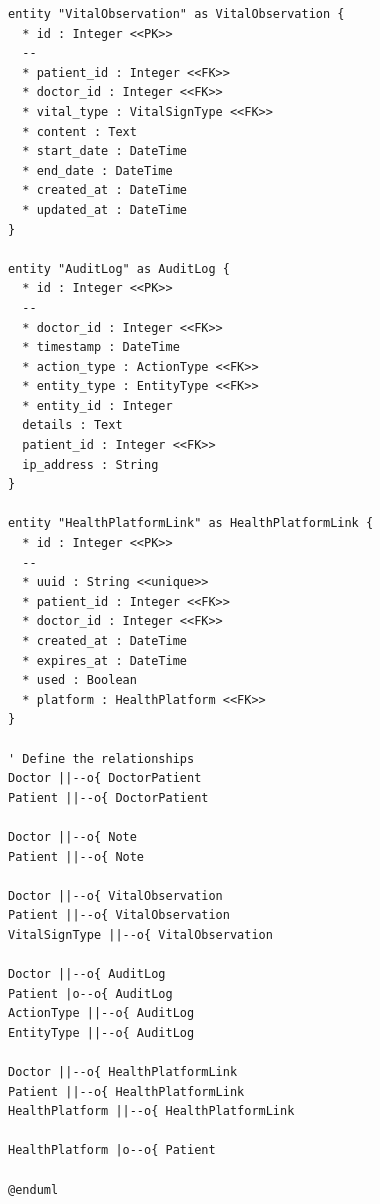 \documentclass[12pt,a4paper,oneside]{report}
\begin{document}
\begin{lstlisting}[basicstyle=\small\ttfamily, breaklines=true]
entity "VitalObservation" as VitalObservation {
  * id : Integer <<PK>>
  --
  * patient_id : Integer <<FK>>
  * doctor_id : Integer <<FK>>
  * vital_type : VitalSignType <<FK>>
  * content : Text
  * start_date : DateTime
  * end_date : DateTime
  * created_at : DateTime
  * updated_at : DateTime
}

entity "AuditLog" as AuditLog {
  * id : Integer <<PK>>
  --
  * doctor_id : Integer <<FK>>
  * timestamp : DateTime
  * action_type : ActionType <<FK>>
  * entity_type : EntityType <<FK>>
  * entity_id : Integer
  details : Text
  patient_id : Integer <<FK>>
  ip_address : String
}

entity "HealthPlatformLink" as HealthPlatformLink {
  * id : Integer <<PK>>
  --
  * uuid : String <<unique>>
  * patient_id : Integer <<FK>>
  * doctor_id : Integer <<FK>>
  * created_at : DateTime
  * expires_at : DateTime
  * used : Boolean
  * platform : HealthPlatform <<FK>>
}

' Define the relationships
Doctor ||--o{ DoctorPatient
Patient ||--o{ DoctorPatient

Doctor ||--o{ Note
Patient ||--o{ Note

Doctor ||--o{ VitalObservation
Patient ||--o{ VitalObservation
VitalSignType ||--o{ VitalObservation

Doctor ||--o{ AuditLog
Patient |o--o{ AuditLog
ActionType ||--o{ AuditLog
EntityType ||--o{ AuditLog

Doctor ||--o{ HealthPlatformLink
Patient ||--o{ HealthPlatformLink
HealthPlatform ||--o{ HealthPlatformLink

HealthPlatform |o--o{ Patient

@enduml

\end{lstlisting}
\end{document}
